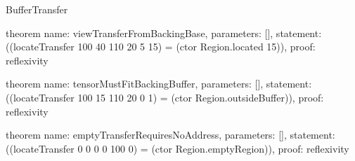 \begin{lexlean}{BufferTransfer}
\begin{semanticmodule}
theorem{
  name: viewTransferFromBackingBase,
  parameters: [],
  statement: ((locateTransfer 100 40 110 20 5 15) = (ctor Region.located 15)),
  proof: reflexivity{}
}

theorem{
  name: tensorMustFitBackingBuffer,
  parameters: [],
  statement: ((locateTransfer 100 15 110 20 0 1) = (ctor Region.outsideBuffer)),
  proof: reflexivity{}
}

theorem{
  name: emptyTransferRequiresNoAddress,
  parameters: [],
  statement: ((locateTransfer 0 0 0 0 100 0) = (ctor Region.emptyRegion)),
  proof: reflexivity{}
}
\end{semanticmodule}
\end{lexlean}

